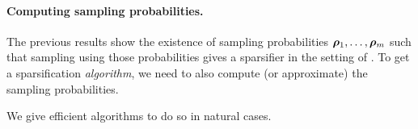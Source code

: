 \documentclass[11pt]{article}
\numberwithin{equation}{section}
\begin{document}



\paragraph{Computing sampling probabilities.}
The previous results show the existence of sampling probabilities \(\bm{\rho}_1, \ldots, \bm{\rho}_m\) such that sampling using those probabilities gives a sparsifier in the setting of .
To get a sparsification \textit{algorithm}, we need to also compute (or approximate) the sampling probabilities.

We give efficient algorithms to do so in natural cases.
\end{document}

